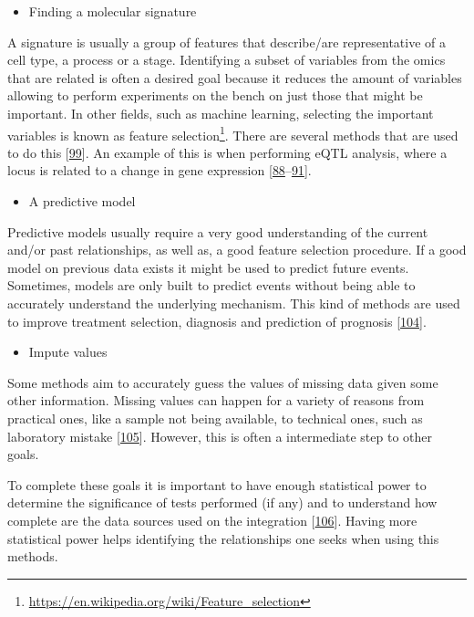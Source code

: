 \documentclass[
  12pt,
  a4paper,
  twoside,
  openright]{book}
\DeclareRobustCommand{\href}[2]{#2\footnote{\url{#1}}}
\providecommand{\tightlist}{%
  \setlength{\itemsep}{0pt}\setlength{\parskip}{0pt}}
\begin{document}
\begin{itemize}
\tightlist
\item
  Finding a molecular signature
\end{itemize}

A signature is usually a group of features that describe/are representative of a cell type, a process or a stage.
Identifying a subset of variables from the omics that are related is often a desired goal because it reduces the amount of variables allowing to perform experiments on the bench on just those that might be important.
In other fields, such as machine learning, selecting the important variables is known as \href{https://en.wikipedia.org/wiki/Feature_selection}{feature selection}.
There are several methods that are used to do this {[}\protect\hyperlink{ref-cavill2016}{99}{]}.
An example of this is when performing eQTL analysis, where a locus is related to a change in gene expression {[}\protect\hyperlink{ref-repnik2016}{88}--\protect\hyperlink{ref-dai2019}{91}{]}.

\begin{itemize}
\tightlist
\item
  A predictive model
\end{itemize}

Predictive models usually require a very good understanding of the current and/or past relationships, as well as, a good feature selection procedure.
If a good model on previous data exists it might be used to predict future events.
Sometimes, models are only built to predict events without being able to accurately understand the underlying mechanism.
This kind of methods are used to improve treatment selection, diagnosis and prediction of prognosis {[}\protect\hyperlink{ref-wheeler2014}{104}{]}.

\begin{itemize}
\tightlist
\item
  Impute values
\end{itemize}

Some methods aim to accurately guess the values of missing data given some other information.
Missing values can happen for a variety of reasons from practical ones, like a sample not being available, to technical ones, such as laboratory mistake {[}\protect\hyperlink{ref-yin2019}{105}{]}.
However, this is often a intermediate step to other goals.

To complete these goals it is important to have enough statistical power to determine the significance of tests performed (if any) and to understand how complete are the data sources used on the integration {[}\protect\hyperlink{ref-tarazona2021}{106}{]}.
Having more statistical power helps identifying the relationships one seeks when using this methods.
\end{document}
